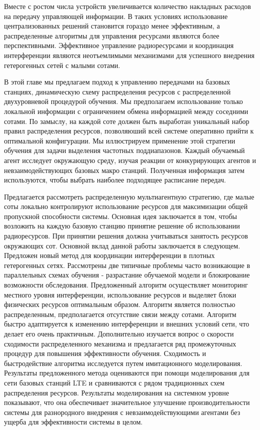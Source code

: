 Вместе с ростом числа устройств увеличивается количество накладных расходов на передачу управляющей информации. В таких условиях использование централизованных решений становится гораздо менее эффективным, а распределенные алгоритмы для управления ресурсами являются более перспективными. Эффективное управление радиоресурсами и координация интерференции являются неотъемлимыми механизмами для успешного внедрения гетерогенных сетей с малыми сотами.   

В этой главе мы предлагаем подход к управлению передачами на базовых станциях, динамическую схему распределения ресурсов с распределенной двухуровневой процедурой обучения. Мы предполагаем использование только локальной информации с ограничением обмена информацией между соседними сотами. По замыслу, на каждой соте должен быть выработан уникальный набор правил распределения ресурсов, позволяюший всей системе оперативно прийти к оптимальной конфигурации. Мы иллюстрируем применение этой стратегии обучения для задачи выделения частотных поддиапазонов. Каждый обучаемый агент исследует окружающую среду, изучая реакции от конкурирующих агентов и невзаимодействующих базовых макро станций. Полученная информация затем используются, чтобы выбрать наиболее подходящее расписание передач. 

Предлагается рассмотреть распределенную мультиагентную стратегию, где малые соты локально контролируют использование ресурсов для максимизации общей пропускной способности системы. Основная идея заключается в том, чтобы возложить на каждую базовую станцию принятие решение об использовании радиоресурсов. При принятии решения должна учитываться занятость ресурсов окружающих сот. Основной вклад данной работы заключается в следующем. Предложен новый метод для координации интерференции в плотных гетерогенных сетях. Рассмотрены две типичные проблемы часто возникающие в параллельных схемах обучения - разрастание обучаемой модели и блокирование возможности обследования. Предложенный алгоритм осуществляет мониторинг местного уровня интерференции, использование ресурсов и выделяет блоки физических ресурсов оптимальным образом. Алгоритм является полностью распределенным, предполагается отсутствие связи между сотами. Алгоритм быстро адаптируется к изменению интерференции и внешних условий сети, что делает его очень практичным. Дополнительно изучается вопрос о скорости сходимости распределенного механизма и предлагается ряд промежуточных процедур для повышения эффективности обучения. Сходимость и быстродействие алгоритма исследуется путем имитационного моделирования. Результаты предложенного метода оцениваются при помощи моделирования для сети базовых станций LTE и сравниваются с рядом традиционных схем распределения ресурсов. Результаты моделирования на системном уровне показывают, что она обеспечивает значительное улучшение производительности системы для разнородного внедрения с невзаимодействующими агентами без ущерба для эффективности системы в целом.

